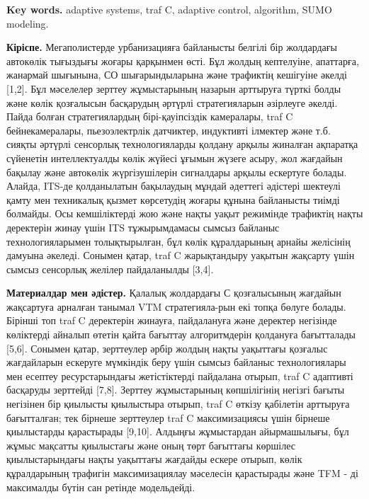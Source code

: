 {\bfseries Key words.} adaptive systems, traf C, adaptive control,
algorithm, SUMO modeling.
\begin{multicols}{2}

{\bfseries Кіріспе.} Мегаполистерде урбанизацияға байланысты белгілі бір
жолдардағы автокөлік тығыздығы жоғары қарқынмен өсті. Бұл жолдың
кептелуіне, апаттарға, жанармай шығынына, СО шығарындыларына және
трафиктің кешігуіне әкелді {[}1,2{]}. Бұл мәселелер зерттеу жұмыстарының
назарын арттыруға түрткі болды және көлік қозғалысын басқарудың әртүрлі
стратегияларын әзірлеуге әкелді. Пайда болған стратегиялардың
бірі-қауіпсіздік камералары, traf C бейнекамералары, пьезоэлектрлік
датчиктер, индуктивті ілмектер және т.б. сияқты әртүрлі сенсорлық
технологияларды қолдану арқылы жиналған ақпаратқа сүйенетін
интеллектуалды көлік жүйесі ұғымын жүзеге асыру, жол жағдайын бақылау
және автокөлік жүргізушілерін сигналдары арқылы ескертуге болады.
Алайда, ITS-де қолданылатын бақылаудың мұндай әдеттегі әдістері шектеулі
қамту мен техникалық қызмет көрсетудің жоғары құнына байланысты тиімді
болмайды. Осы кемшіліктерді жою және нақты уақыт режимінде трафиктің
нақты деректерін жинау үшін ITS тұжырымдамасы сымсыз байланыс
технологияларымен толықтырылған, бұл көлік құралдарының арнайы желісінің
дамуына әкеледі. Сонымен қатар, traf C жарықтандыру уақытын жақсарту
үшін сымсыз сенсорлық желілер пайдаланылды {[}3,4{]}.

{\bfseries Материалдар мен әдістер.} Қалалық жолдардағы С қозғалысының
жағдайын жақсартуға арналған танымал VTM стратегияла-рын екі топқа бөлуге
болады. Бірінші топ traf C деректерін жинауға, пайдалануға және деректер
негізінде көліктерді айналып өтетін қайта бағыттау алгоритмдерін
қолдануға бағытталады {[}5,6{]}. Сонымен қатар, зерттеулер әрбір жолдың
нақты уақыттағы қозғалыс жағдайларын ескеруге мүмкіндік беру үшін сымсыз
байланыс технологиялары мен есептеу ресурстарындағы жетістіктерді
пайдалана отырып, traf C адаптивті басқаруды зерттейді {[}7,8{]}.
Зерттеу жұмыстарының көпшілігінің негізгі бағыты негізінен бір қиылысты
қиылыстыра отырып, traf C өткізу қабілетін арттыруға бағытталған; тек
бірнеше зерттеулер traf C максимизациясы үшін бірнеше қиылыстарды
қарастырады {[}9,10{]}. Алдыңғы жұмыстардан айырмашылығы, бұл жұмыс
мақсатты қиылыстағы және оның төрт бағыттағы көршілес қиылыстарындағы
нақты уақыттағы жағдайды ескере отырып, көлік құралдарының трафигін
максимизациялау мәселесін қарастырады және TFM - ді максималды бүтін сан
ретінде модельдейді.


\end{multicols}
